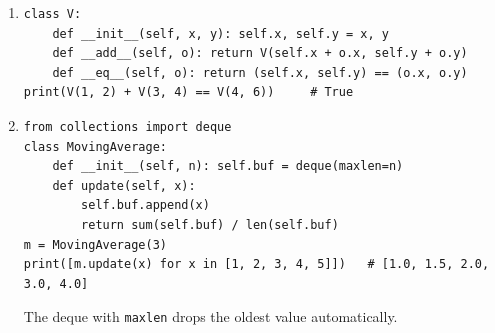 \begin{enumerate}[label=\textbf{\ansnum.\arabic*}]
  \item
\begin{verbatim}
class V:
    def __init__(self, x, y): self.x, self.y = x, y
    def __add__(self, o): return V(self.x + o.x, self.y + o.y)
    def __eq__(self, o): return (self.x, self.y) == (o.x, o.y)
print(V(1, 2) + V(3, 4) == V(4, 6))     # True
\end{verbatim}
  \item[\textbf{\ansnum.10}]
\begin{verbatim}
from collections import deque
class MovingAverage:
    def __init__(self, n): self.buf = deque(maxlen=n)
    def update(self, x):
        self.buf.append(x)
        return sum(self.buf) / len(self.buf)
m = MovingAverage(3)
print([m.update(x) for x in [1, 2, 3, 4, 5]])   # [1.0, 1.5, 2.0, 3.0, 4.0]
\end{verbatim}
  The deque with \texttt{maxlen} drops the oldest value automatically.
\end{enumerate}
